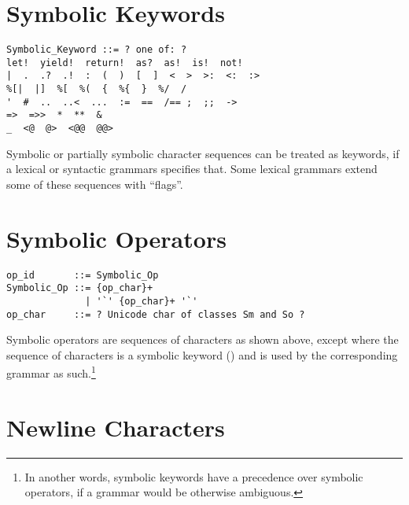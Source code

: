 \section{Symbolic Keywords}
\label{sec:symbolic-keywords}

\syntax\begin{lstlisting}[deletekeywords={of}]
Symbolic_Keyword ::= ? one of: ?
let!  yield!  return!  as?  as!  is!  not!
|  .  .?  .!  :  (  )  [  ]  <  >  >:  <:  :>
%[|  |]  %[  %(  {  %{  }  %/  /
'  #  ..  ..<  ...  :=  ==  /== ;  ;;  ->  
=>  =>>  *  **  &
_  <@  @>  <@@  @@>
\end{lstlisting}

Symbolic or partially symbolic character sequences can be treated as keywords, if a lexical or syntactic grammars specifies that. Some lexical grammars extend some of these sequences with ``flags''. 





\section{Symbolic Operators}
\label{sec:symbolic-operators}

\syntax\begin{lstlisting}[deletekeywords={of,and}]
op_id       ::= Symbolic_Op
Symbolic_Op ::= {op_char}+
              | '`' {op_char}+ '`'
op_char     ::= ? Unicode char of classes Sm and So ?
\end{lstlisting}

Symbolic operators are sequences of characters as shown above, except where the sequence of characters is a symbolic keyword () and is used by the corresponding grammar as such.\footnote{In another words, symbolic keywords have a precedence over symbolic operators, if a grammar would be otherwise ambiguous.}





\section{Newline Characters}
\label{sec:newlinecharacters}


